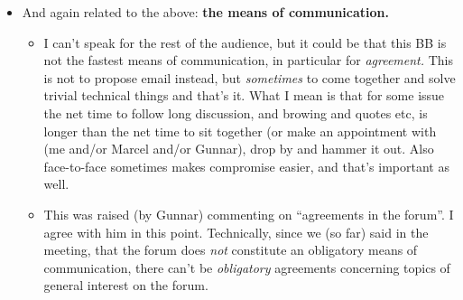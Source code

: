 \begin{itemize}
\begin{itemize}
    The counter argument, ``perhaps the other spec's had been some open
    point, but at least \emph{we} had to implement it'' does not really
    hold, because \emph{all} have to implement it. Live would indeed be
    easier if each group could implement whatever it chooses (spec 1, or
    spec 2, or some additions/subset), but that's not the idea.
  \item Related to the above concern (``general development, apart from
    technical details'') I further agree with Sandro (if that was his point):
    No unannouced critical changes which influences someone else. This holds
    even for \emph{healthy} changes.\footnote{Unless one really trusts each
      other.} 
  \end{itemize}
\item And again related to the above: \textbf{the means of communication.}
    \begin{itemize}
    \item I can't speak for the rest of the audience, but it could be that
      this BB is not the fastest means of communication, in particular for
      \emph{agreement.} This is not to propose email instead, but
      \emph{sometimes} to come together and solve trivial technical things and
      that's it. What I mean is that for some issue the net time to follow
      long discussion, and browing and quotes etc, is longer than the net time
      to sit together (or make an appointment with (me and/or Marcel and/or
      Gunnar), drop by and hammer it out. Also face-to-face sometimes makes
      compromise easier, and that's important as well.
    \item This was raised (by Gunnar) commenting on ``agreements in the
      forum''. I agree with him in this point. Technically, since we (so far)
      said in the meeting, that the forum does \emph{not} constitute an
      obligatory means of communication, there can't be \emph{obligatory}
      agreements concerning topics of general interest on the forum.
      

\end{itemize}
\end{itemize}
